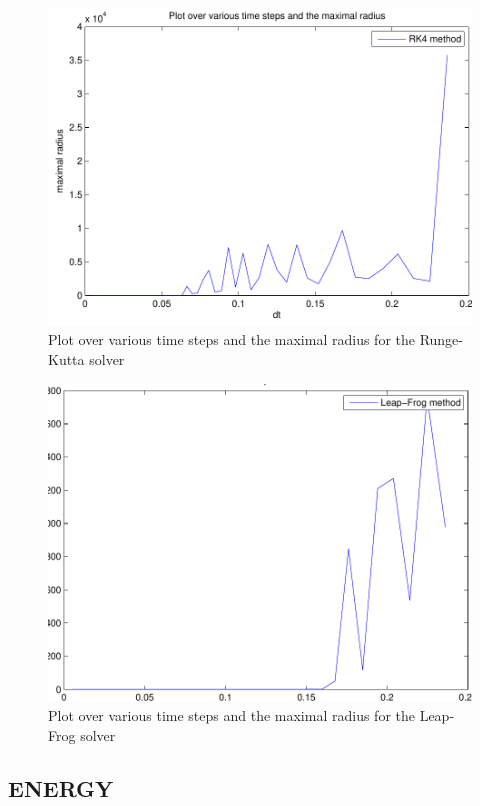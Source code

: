 \documentclass[a4paper,12pt, english]{article}
\begin{document}
	
\begin{figure}
	\centering
	\includegraphics[scale=0.5]{timestep_rk4.pdf}
	\caption{Plot over various time steps and the maximal radius for the Runge-Kutta solver}
	\label{fig:RK4_timestep}
\end{figure}

\begin{figure}
	\centering
	\includegraphics[scale=0.5]{timestep_LeapFrog.pdf}
	\caption{Plot over various time steps and the maximal radius for the Leap-Frog solver}
	\label{fig:LF_timestep}
\end{figure}



\subsection*{ENERGY}
\end{document}
